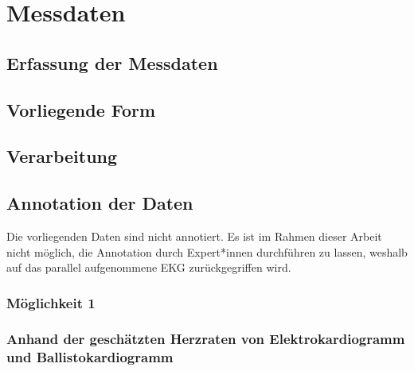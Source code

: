 \chapter{Messdaten}

\section{Erfassung der Messdaten}

\section{Vorliegende Form}

\section{Verarbeitung}

\section{Annotation der Daten}

Die vorliegenden Daten sind nicht annotiert. Es ist im Rahmen dieser Arbeit nicht möglich, die Annotation durch Expert*innen durchführen zu lassen, weshalb auf das parallel aufgenommene \ac{EKG} zurückgegriffen wird.

\subsection{Möglichkeit 1} %

\subsection{Anhand der geschätzten Herzraten von Elektrokardiogramm und Ballistokardiogramm}
